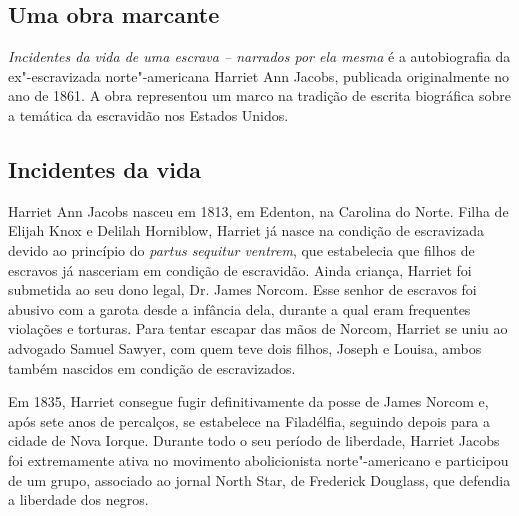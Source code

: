 \documentclass[11pt]{extarticle}
\begin{document}
\subsection{Uma obra marcante}

\emph{Incidentes da vida de uma escrava -- narrados por ela mesma} é a
autobiografia da ex"-escravizada norte"-americana Harriet Ann Jacobs,
publicada originalmente no ano de 1861. A obra representou um marco na
tradição de escrita biográfica sobre a temática da escravidão nos
Estados Unidos.




\subsection{Incidentes da vida}

Harriet Ann Jacobs nasceu em 1813, em Edenton, na Carolina do
Norte. Filha de Elijah Knox e Delilah Horniblow, Harriet já nasce na
condição de escravizada devido ao princípio do \textit{partus sequitur ventrem},
que estabelecia que filhos de escravos já nasceriam em condição de
escravidão. Ainda criança, Harriet foi submetida ao seu dono legal, 
Dr. James Norcom. Esse senhor de escravos foi abusivo com a garota desde a
infância dela, durante a qual eram frequentes violações e torturas. Para
tentar escapar das mãos de Norcom, Harriet se uniu ao advogado Samuel
Sawyer, com quem teve dois filhos, Joseph e Louisa, ambos também
nascidos em condição de escravizados.





Em 1835, Harriet consegue fugir definitivamente da posse de James Norcom
e, após sete anos de percalços, se estabelece na Filadélfia, seguindo
depois para a cidade de Nova Iorque. Durante todo o seu período de
liberdade, Harriet Jacobs foi extremamente ativa no movimento
abolicionista norte"-americano e participou de um grupo, associado ao
jornal North Star, de Frederick Douglass, que defendia a liberdade dos
negros.


\end{document}
